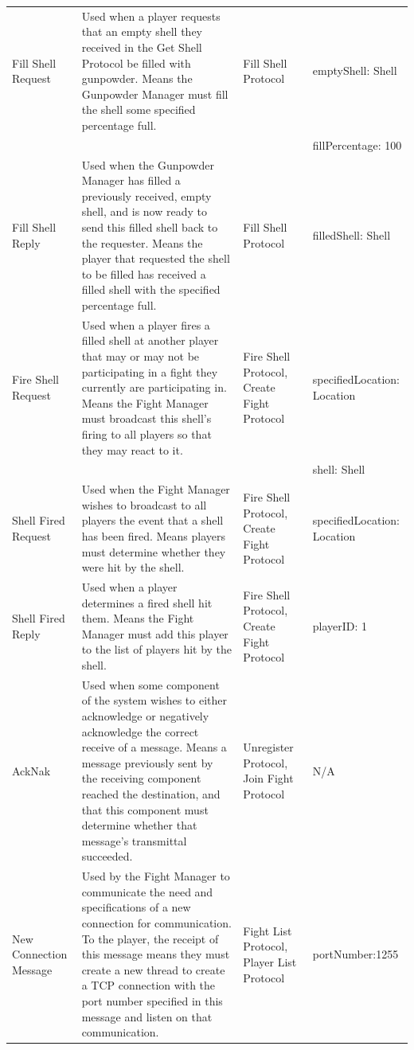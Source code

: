 \documentclass[12pt]{article}
\begin{document}
\begin{supertabular}{|p{2cm}|p{5cm}|p{3cm}|p{4cm}|}
				Fill Shell Request&Used when a player requests that an empty shell they received in the Get Shell Protocol be filled with gunpowder. Means the Gunpowder Manager must fill the shell some specified percentage full.&Fill Shell Protocol&emptyShell: Shell\\&&&fillPercentage: 100\\ \hline
				Fill Shell Reply&Used when the Gunpowder Manager has filled a previously received, empty shell, and is now ready to send this filled shell back to the requester. Means the player that requested the shell to be filled has received a filled shell with the specified percentage full.&Fill Shell Protocol&filledShell: Shell\\ \hline
				
					Fire Shell Request&Used when a player fires a filled shell at another player that may or may not be participating in a fight they currently are participating in. Means the Fight Manager must broadcast this shell's firing to all players so that they may react to it.&Fire Shell Protocol, Create Fight Protocol&specifiedLocation: Location\\&&&shell: Shell\\ \hline
					Shell Fired Request&Used when the Fight Manager wishes to broadcast to all players the event that a shell has been fired. Means players must determine whether they were hit by the shell.&Fire Shell Protocol, Create Fight Protocol&specifiedLocation: Location\\ \hline
					Shell Fired Reply&Used when a player determines a fired shell hit them. Means the Fight Manager must add this player to the list of players hit by the shell.&Fire Shell Protocol, Create Fight Protocol&playerID: 1\\ \hline
				
					AckNak&Used when some component of the system wishes to either acknowledge or negatively acknowledge the correct receive of a message. Means a message previously sent by the receiving component reached the destination, and that this component must determine whether that message's transmittal succeeded.&Unregister Protocol, Join Fight Protocol&N/A\\ \hline
					
					New Connection Message&Used by the Fight Manager to communicate the need and specifications of a new connection for communication. To the player, the receipt of this message means they must create a new thread to create a TCP connection with the port number specified in this message and listen on that communication.&Fight List Protocol, Player List Protocol&portNumber:1255\\ \hline
			\end{supertabular}
		
\end{document}
